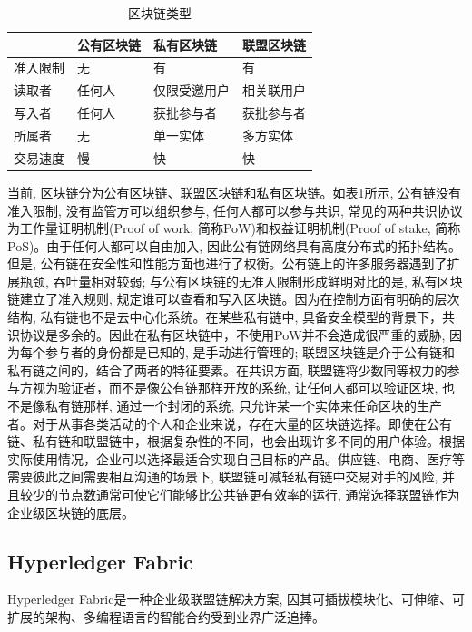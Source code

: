 {\footnotesize
\begin{longtable}[h]{m{70pt}|m{70pt}|m{70pt}|m{70pt}}
    \caption[区块链类型]{区块链类型} \label{blockchain_type} \\
        \hline  
        &公有区块链&私有区块链&联盟区块链\\
        \hline
        准入限制&无&有&有\\
        \hline
        读取者&任何人&仅限受邀用户&相关联用户\\
        \hline
        写入者&任何人&获批参与者&获批参与者\\
        \hline
        所属者&无&单一实体&多方实体\\
        \hline
        交易速度&慢&快&快\\
        \hline
    \end{longtable}
}

当前, 区块链分为公有区块链、联盟区块链和私有区块链。如表\ref{blockchain_type}所示, 公有链没有准入限制, 没有监管方可以组织参与, 任何人都可以参与共识, 常见的两种共识协议为工作量证明机制(Proof of work, 简称PoW)和权益证明机制(Proof of stake, 简称PoS)。由于任何人都可以自由加入, 因此公有链网络具有高度分布式的拓扑结构。但是, 公有链在安全性和性能方面也进行了权衡。公有链上的许多服务器遇到了扩展瓶颈, 吞吐量相对较弱; 与公有区块链的无准入限制形成鲜明对比的是, 私有区块链建立了准入规则, 规定谁可以查看和写入区块链。因为在控制方面有明确的层次结构, 私有链也不是去中心化系统。在某些私有链中, 具备安全模型的背景下，共识协议是多余的。因此在私有区块链中，不使用PoW并不会造成很严重的威胁, 因为每个参与者的身份都是已知的, 是手动进行管理的; 联盟区块链是介于公有链和私有链之间的，结合了两者的特征要素。在共识方面, 联盟链将少数同等权力的参与方视为验证者，而不是像公有链那样开放的系统, 让任何人都可以验证区块, 也不是像私有链那样, 通过一个封闭的系统, 只允许某一个实体来任命区块的生产者。对于从事各类活动的个人和企业来说，存在大量的区块链选择。即使在公有链、私有链和联盟链中，根据复杂性的不同，也会出现许多不同的用户体验。根据实际使用情况，企业可以选择最适合实现自己目标的产品。供应链、电商、医疗等需要彼此之间需要相互沟通的场景下, 联盟链可减轻私有链中交易对手的风险, 并且较少的节点数通常可使它们能够比公共链更有效率的运行, 通常选择联盟链作为企业级区块链的底层。



\subsection{Hyperledger Fabric}
Hyperledger Fabric\footnotemark[1]是一种企业级联盟链解决方案, 因其可插拔模块化、可伸缩、可扩展的架构、多编程语言的智能合约受到业界广泛追捧。

